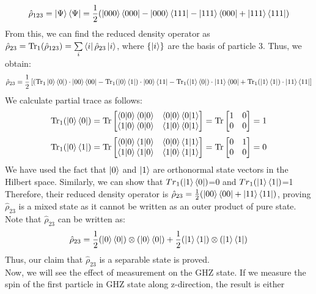 \documentclass{scrartcl}
\begin{document}
\[
\hat{\rho}_{123} = \ket{\Psi}\bra{\Psi}
 = \frac{1}{2} (\ket{000}\bra{000} - \ket{000}\bra{111} - \ket{111}\bra{000} + \ket{111}\bra{111})
\]
From this, we can find the reduced density operator as $\hat{\rho}_{23} = \mathrm{Tr}_1(\hat{\rho}_{123}) = \sum\limits_i \bra{i}\hat{\rho}_{23}\ket{i}$, where $\{\ket{i}\}$ are the basis of particle 3. Thus, we obtain: 
\[ \hat{\rho}_{23}
= \frac{1}{2} \left[(\mathrm{Tr}_1\ket{0}\bra{0})\cdot\ket{00}\bra{00} - \mathrm{Tr}_1(\ket{0}\bra{1})\cdot\ket{00}\bra{11} - \mathrm{Tr}_1(\ket{1}\bra{0})\cdot\ket{11}\bra{00} + \mathrm{Tr}_1(\ket{1}\bra{1})\cdot\ket{11}\bra{11}\right]
\]
We calculate partial trace as follows:
\[
\text{Tr}_1(\ket{0}\bra{0}) = \text{Tr} \left[
\begin{matrix}
\braket{0|0} \braket{0|0} & \braket{0|0}\braket{0|1} \\
\braket{1|0} \braket{0|0} & \braket{1|0}\braket{0|1}
\end{matrix}
\right]
= \text{Tr} \left[
\begin{matrix}
1 & 0 \\
0 & 0
\end{matrix}
\right] = 1
\]
\[
\text{Tr}_1(\ket{0}\bra{1}) = \text{Tr} \left[
\begin{matrix}
\braket{0|0} \braket{1|0} & \braket{0|0}\braket{1|1} \\
\braket{1|0} \braket{1|0} & \braket{1|0}\braket{1|1}
\end{matrix}
\right]
= \text{Tr} \left[
\begin{matrix}
0 & 1 \\
0 & 0
\end{matrix}
\right] = 0
\]
We have used the fact that  $\ket{0}$ and $\ket{1}$ are orthonormal state vectors in the Hilbert space. Similarly, we can show that ${Tr}_1(\ket{1}\bra{0})$=0 and  ${Tr}_1(\ket{1}\bra{1})$=1\\[0.3cm]
Therefore, their reduced density operator is $
\hat{\rho}_{23} = \frac{1}{2} (\ket{00}\bra{00} + \ket{11}\bra{11})
$, proving $\hat{\rho}_{23}$ is a mixed state as it cannot be written as an outer product of pure state. Note that $\hat{\rho}_{23}$ can be written as:
\[
\hat{\rho}_{23} = \frac{1}{2} (\ket{0}\bra{0}) \otimes (\ket{0}\bra{0}) + \frac{1}{2} (\ket{1}\bra{1}) \otimes (\ket{1}\bra{1})
\]
Thus, our claim that $\hat{\rho}_{23}$ is a separable state is proved.\\[0.3cm]
Now, we will see the effect of measurement on the GHZ state. If we measure the spin of the first particle in GHZ state along z-direction, the result is either 
\end{document}
